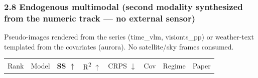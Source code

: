 \documentclass[
  9pt,
]{article}
\begin{document}
\subsubsection{2.8 Endogenous multimodal (second modality synthesized
from the numeric track --- no external
sensor)}\label{endogenous-multimodal-second-modality-synthesized-from-the-numeric-track-no-external-sensor}

Pseudo-images rendered from the series (time\_\allowbreak{}vlm, visionts\_\allowbreak{}pp) or
weather-text templated from the covariates (aurora). No satellite/sky
frames consumed.

\begin{longtable}[]{@{}
  >{\raggedright\arraybackslash}p{}
  >{\raggedright\arraybackslash}p{}
  >{\raggedright\arraybackslash}p{}
  >{\raggedright\arraybackslash}p{}
  >{\raggedright\arraybackslash}p{}
  >{\raggedright\arraybackslash}p{}
  >{\raggedright\arraybackslash}p{}
  >{\raggedright\arraybackslash}p{}@{}}
\toprule\noalign{}
\begin{minipage}[b]{\linewidth}\raggedright
Rank
\end{minipage} & \begin{minipage}[b]{\linewidth}\raggedright
Model
\end{minipage} & \begin{minipage}[b]{\linewidth}\raggedright
\textbf{SS \(\uparrow\)}
\end{minipage} & \begin{minipage}[b]{\linewidth}\raggedright
R\textsuperscript{2} \(\uparrow\)
\end{minipage} & \begin{minipage}[b]{\linewidth}\raggedright
CRPS \(\downarrow\)
\end{minipage} & \begin{minipage}[b]{\linewidth}\raggedright
Cov
\end{minipage} & \begin{minipage}[b]{\linewidth}\raggedright
Regime
\end{minipage} & \begin{minipage}[b]{\linewidth}\raggedright
Paper
\end{minipage} \\

\end{longtable}
\end{document}
